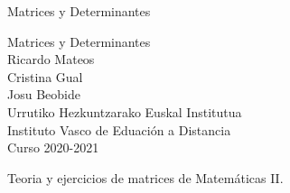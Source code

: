 \documentclass[oneside,12pt,]{book}
\newcommand{\titlepagefont}{\relax}
\begin{document}
\frontmatter
\thispagestyle{empty}
{\titlepagefont\centering
\vspace*{0.28\textheight}
{\Huge Matrices y Determinantes}\\}
\clearpage
\thispagestyle{empty}
{\titlepagefont\centering
\vspace*{0.14\textheight}
{\Huge Matrices y Determinantes}\\[3\baselineskip]
{\Large Ricardo Mateos\\
 Cristina Gual\\
 Josu Beobide}\\[0.5\baselineskip]
{\Large Urrutiko Hezkuntzarako Euskal Institutua\\
Instituto Vasco de Eduación a Distancia}\\[3\baselineskip]
{\Large Curso 2020-2021}\\}
\clearpage
\thispagestyle{empty}
\null\clearpage
Teoria y ejercicios de matrices de Matemáticas II.%
\setcounter{tocdepth}{1}
\renewcommand*\contentsname{Índice}
\tableofcontents
\mainmatter
%
%
\typeout{************************************************}
\typeout{************************************************}
%
\end{document}
